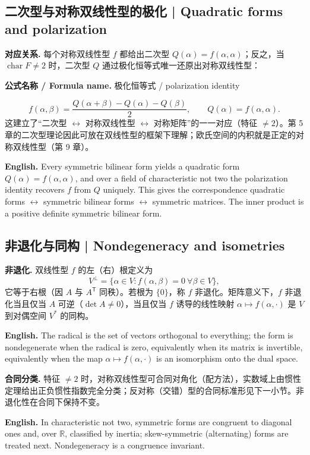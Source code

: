 \documentclass[UTF8,11pt,a4paper]{ctexart}
\newcommand{\EN}[1]{\par\noindent\textbf{English.} #1\par}
\newcommand{\FORMULA}[2]{\par\noindent\textbf{公式名称 / Formula name.} #1 / #2\par}
\begin{document}
\subsection{二次型与对称双线性型的极化 | Quadratic forms and polarization}
\noindent\textbf{对应关系.} 每个对称双线性型 $f$ 都给出二次型 $Q(\alpha)=f(\alpha,\alpha)$；反之，当 $\operatorname{char}F\ne2$ 时，二次型 $Q$ 通过极化恒等式唯一还原出对称双线性型：
\FORMULA{极化恒等式}{polarization identity}
\[
f(\alpha,\beta)=\frac{Q(\alpha+\beta)-Q(\alpha)-Q(\beta)}{2},\qquad Q(\alpha)=f(\alpha,\alpha).
\]
这建立了“二次型 $\leftrightarrow$ 对称双线性型 $\leftrightarrow$ 对称矩阵”的一一对应（特征 $\ne2$）。第 5 章的二次型理论因此可放在双线性型的框架下理解；欧氏空间的内积就是正定的对称双线性型（第 9 章）。
\EN{Every symmetric bilinear form yields a quadratic form $Q(\alpha)=f(\alpha,\alpha)$, and over a field of characteristic not two the polarization identity recovers $f$ from $Q$ uniquely. This gives the correspondence quadratic forms $\leftrightarrow$ symmetric bilinear forms $\leftrightarrow$ symmetric matrices. The inner product is a positive definite symmetric bilinear form.}

\subsection{非退化与同构 | Nondegeneracy and isometries}
\noindent\textbf{非退化.} 双线性型 $f$ 的左（右）根定义为
\[
V^\perp=\{\alpha\in V:f(\alpha,\beta)=0\ \forall\beta\in V\},
\]
它等于右根（因 $A$ 与 $A^{\mathsf T}$ 同秩）。若根为 $\{0\}$，称 $f$ 非退化。矩阵意义下，$f$ 非退化当且仅当 $A$ 可逆（$\det A\ne0$），当且仅当 $f$ 诱导的线性映射 $\alpha\mapsto f(\alpha,\cdot)$ 是 $V$ 到对偶空间 $V^*$ 的同构。
\EN{The radical is the set of vectors orthogonal to everything; the form is nondegenerate when the radical is zero, equivalently when its matrix is invertible, equivalently when the map $\alpha\mapsto f(\alpha,\cdot)$ is an isomorphism onto the dual space.}
\noindent\textbf{合同分类.} 特征 $\ne2$ 时，对称双线性型可合同对角化（配方法），实数域上由惯性定理给出正负惯性指数完全分类；反对称（交错）型的合同标准形见下一小节。非退化性在合同下保持不变。
\EN{In characteristic not two, symmetric forms are congruent to diagonal ones and, over $\mathbb R$, classified by inertia; skew-symmetric (alternating) forms are treated next. Nondegeneracy is a congruence invariant.}
\end{document}
